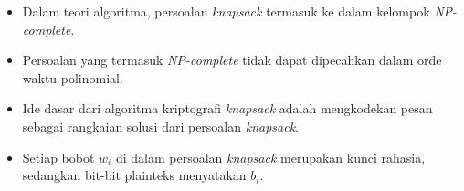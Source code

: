 \documentclass{article}
\begin{document}

\begin{itemize}
    \item Dalam teori algoritma, persoalan \textit{knapsack} termasuk ke dalam kelompok \textit{NP-complete}.
    \item Persoalan yang termasuk \textit{NP-complete} tidak dapat dipecahkan dalam orde waktu polinomial.
    \item Ide dasar dari algoritma kriptografi \textit{knapsack} adalah mengkodekan pesan sebagai rangkaian solusi dari persoalan \textit{knapsack}.
    \item Setiap bobot $w_i$ di dalam persoalan \textit{knapsack} merupakan kunci rahasia, sedangkan bit-bit plainteks menyatakan $b_i$.
\end{itemize}
\end{document}
